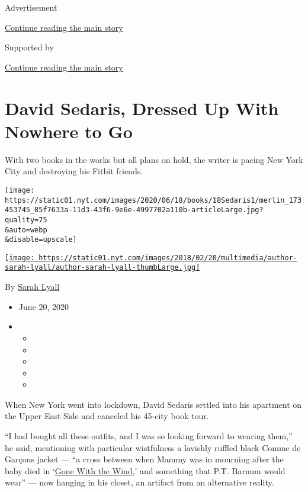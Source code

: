 Advertisement

\protect\hyperlink{after-top}{Continue reading the main story}

Supported by

\protect\hyperlink{after-sponsor}{Continue reading the main story}

\hypertarget{david-sedaris-dressed-up-with-nowhere-to-go}{%
\section{David Sedaris, Dressed Up With Nowhere to
Go}\label{david-sedaris-dressed-up-with-nowhere-to-go}}

With two books in the works but all plans on hold, the writer is pacing
New York City and destroying his Fitbit friends.

\texttt{[image: https://static01.nyt.com/images/2020/06/18/books/18Sedaris1/merlin\_173453745\_85f7633a-11d3-43f6-9e6e-4997702a110b-articleLarge.jpg?quality=75\\\&auto=webp\\\&disable=upscale]}

\href{https://www.nytimes.com/by/sarah-lyall}{\texttt{[image: https://static01.nyt.com/images/2018/02/20/multimedia/author-sarah-lyall/author-sarah-lyall-thumbLarge.jpg]}}

By \href{https://www.nytimes.com/by/sarah-lyall}{Sarah Lyall}

\begin{itemize}
\item
  June 20, 2020
\item
  \begin{itemize}
  \item
  \item
  \item
  \item
  \item
  \end{itemize}
\end{itemize}

When New York went into lockdown, David Sedaris settled into his
apartment on the Upper East Side and canceled his 45-city book tour.

``I had bought all these outfits, and I was so looking forward to
wearing them,'' he said, mentioning with particular wistfulness a
lavishly ruffled black Comme de Garçons jacket --- ``a cross between
when Mammy was in mourning after the baby died in
`\href{https://www.nytimes.com/2020/06/14/movies/gone-with-the-wind-battle.html}{Gone
With the Wind},' and something that P.T. Barnum would wear'' --- now
hanging in his closet, an artifact from an alternative reality.

